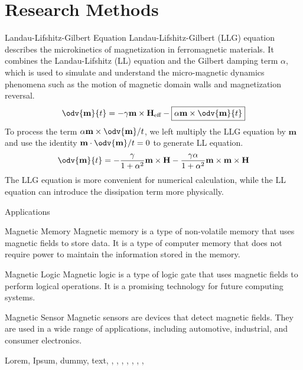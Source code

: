 \documentclass[ mode = beamer, handout ]{hduthesis}
\begin{document}
\maketitle

\section{Research Methods}

\begin{frame}{Landau-Lifshitz-Gilbert Equation}
  \pause
  Landau-Lifshitz-Gilbert (LLG) equation describes the microkinetics of magnetization in ferromagnetic materials. It combines the Landau-Lifshitz (LL) equation and the Gilbert damping term $\alpha$, which is used to simulate and understand the micro-magnetic dynamics phenomena such as the motion of magnetic domain walls and magnetization reversal.
  \pause
  \begin{equation}
    \odv{\mathbf m}{t} = -\gamma \mathbf m \times \mathbf H_\text{eff} -
    \boxed{\alpha \mathbf m \times \odv{\mathbf m}{t}}
  \end{equation}
  \pause
  To process the term $\alpha \mathbf m \times \odv{\mathbf m}/{t}$,
  we left multiply the LLG equation by $\mathbf m$ and use the identity
  $\mathbf m \cdot \odv{\mathbf m}/{t} = 0$ to generate LL equation.
  \pause
  \begin{equation}
    \odv{\mathbf m}{t} = -\frac{\gamma}{1 + \alpha^2} \mathbf m \times \mathbf H - \frac{\gamma\alpha}{1 + \alpha^2} \mathbf m \times \mathbf m \times \mathbf H
  \end{equation}
  \pause
  \alert{The LLG equation is more convenient for numerical calculation, while the LL equation can introduce the dissipation term more physically.}
\end{frame}

\begin{frame}{Applications}
  \pause
  \begin{block}{Magnetic Memory}
    Magnetic memory is a type of non-volatile memory that uses magnetic fields to store data. It is a type of computer memory that does not require power to maintain the information stored in the memory.
  \end{block}
  \pause
  \begin{exampleblock}{Magnetic Logic}
    Magnetic logic is a type of logic gate that uses magnetic fields to perform logical operations. It is a promising technology for future computing systems.
  \end{exampleblock}
  \pause
  \begin{alertblock}{Magnetic Sensor}
    Magnetic sensors are devices that detect magnetic fields. They are used in a wide range of applications, including automotive, industrial, and consumer electronics.
  \end{alertblock}
  Lorem\cite{xu2023unified},
  Ipsum\cite{wang2023electrical},
  dummy\cite{haug2008quantum},
  text\cite{wang2024switching},
  \cite{jhuria2020spin},
  \cite{gilbert2004phenomenological},
  \cite{foros2005magnetization},
  \cite{chudnovskiy2008spin},
  \cite{foros2009noise},
  \cite{swiebodzinski2010spin},
  \cite{brataas2008scattering},
  \cite{brataas2011magnetization}
\end{frame}
\end{document}
